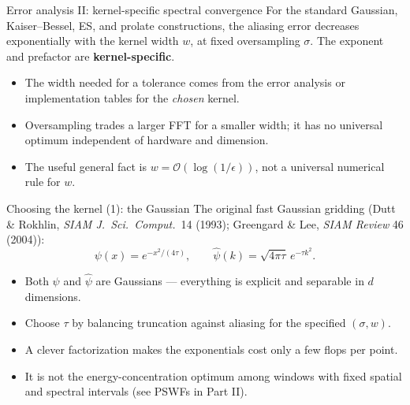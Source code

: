 \documentclass[aspectratio=169,11pt]{beamer}
\newcommand{\cO}{\mathcal{O}}
\newcommand{\y}{\bm{y}}
\newcommand{\hl}[1]{{\color{CCMorange}\textbf{#1}}}
\newcommand{\gray}[1]{{\color{mygray}#1}}
\begin{document}
\begin{frame}{Error analysis II: kernel-specific spectral convergence}
\small
For the standard Gaussian, Kaiser--Bessel, ES, and prolate constructions, the aliasing error decreases exponentially with the kernel width \(w\), at fixed oversampling \(\sigma\). The exponent and prefactor are \hl{kernel-specific}.
\begin{itemize}
  \item The width needed for a tolerance comes from the error analysis or implementation tables for the \emph{chosen} kernel.
  \item Oversampling trades a larger FFT for a smaller width; it has no universal optimum independent of hardware and dimension.
  \item The useful general fact is \(w=\cO(\log(1/\epsilon))\), not a universal numerical rule for \(w\).
\end{itemize}
\begin{center}
\end{center}
\end{frame}

\begin{frame}{Choosing the kernel (1): the Gaussian}
\small
The original fast Gaussian gridding \gray{(Dutt \& Rokhlin, \emph{SIAM J.\ Sci.\ Comput.}\ 14 (1993); Greengard \& Lee, \emph{SIAM Review} 46 (2004))}:
\[
  \psi(x)=e^{-x^2/(4\tau)},\qquad \widehat\psi(k)=\sqrt{4\pi\tau}\,e^{-\tau k^2}.
\]
\begin{itemize}
  \item Both \(\psi\) and \(\widehat\psi\) are Gaussians --- everything is explicit and separable in \(d\) dimensions.
  \item Choose \(\tau\) by balancing truncation against aliasing for the specified \((\sigma,w)\).
  \item A clever factorization makes the exponentials cost only a few flops per point.
  \item It is not the energy-concentration optimum among windows with fixed spatial and spectral intervals (see PSWFs in Part II).
\end{itemize}
\end{frame}
\end{document}
